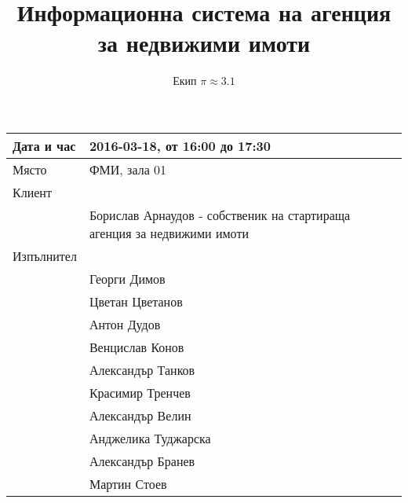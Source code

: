 \documentclass[]{article}
\begin{document}
\title{Информационна система на агенция за недвижими имоти}
\author{Екип $\pi \approx 3.1$}

\maketitle

\begin{center}

\begin{tabular}{|l|l|}
\hline
Дата и час	& 2016-03-18, от 16:00 до 17:30 \\ \hline
Място		& ФМИ, зала 01 \\ \hline
Клиент		&  \\ \hline
			& Борислав Арнаудов - собственик на стартираща агенция за недвижими имоти \\ \hline
Изпълнител	&  \\ \hline
			& Георги Димов \\ \hline
			& Цветан Цветанов \\ \hline
			& Антон Дудов \\ \hline
			& Венцислав Конов \\ \hline
			& Александър Танков \\ \hline
			& Красимир Тренчев \\ \hline
			& Александър Велин \\ \hline
			& Анджелика Туджарска \\ \hline
			& Александър Бранев \\ \hline
			& Мартин Стоев \\ \hline
\end{tabular}

\end{center}
\end{document}
